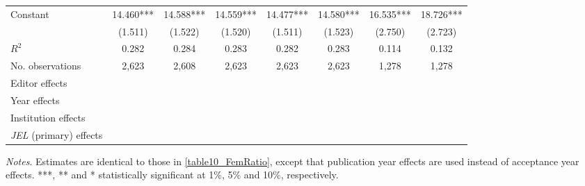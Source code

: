 \begin{table}
\begin{adjustwidth}{-0.085cm}{}
\begin{threeparttable}
\begin{tabular}{p{2.64cm}SSSSSSS}
            Constant                      &      14.460***&      14.588***&      14.559***&      14.477***&      14.580***&      16.535***&      18.726***\\
                                          &     (1.511)   &     (1.522)   &     (1.520)   &     (1.511)   &     (1.523)   &     (2.750)   &     (2.723)   \\
            \midrule
            \(R^2\)                       &       0.282   &       0.284   &       0.283   &       0.282   &       0.283   &       0.114   &       0.132   \\
            No. observations              &       2,623   &       2,608   &       2,623   &       2,623   &       2,623   &       1,278   &       1,278   \\
            \midrule
            Editor effects        &           {}   &           {}   &           {}   &           {}   &           {}   &           {}   &           {}   \\
            Year effects                  &           {}   &           {}   &           {}   &           {}   &           {}   &           {}   &           {}   \\
            Institution effects           &           {}   &           {}   &           {}   &           {}   &           {}   &           {}   &           {}   \\
            \textit{JEL} (primary) effects&               &               &               &               &               &               &           {}   \\
            \bottomrule
        \end{tabular}
        \begin{tablenotes}
            \tiny
            \item \textit{Notes}. Estimates are identical to those in \autoref{table10_FemRatio}, except that publication year effects are used instead of acceptance year effects. ***, ** and * statistically significant at 1\%, 5\% and 10\%, respectively.
        \end{tablenotes}
    \end{threeparttable}
    \end{adjustwidth}
\end{table}